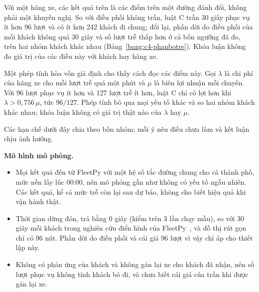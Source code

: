 Với một hãng xe, các kết quả trên là các điểm trên một đường đánh đổi, không phải một khuyến nghị. So với điều phối
không trần, luật C trần 30 giây phục vụ ít hơn 96 lượt và có ít hơn 242 khách đi chung; đổi lại, phần dời do điều phối
của mỗi khách không quá 30 giây và số lượt trễ thấp hơn ở cả bốn ngưỡng đã đo, trên hai nhóm khách khác nhau
(Bảng~\ref{bang:c4-phanbotre}). Khóa luận không đo giá trị của các điều này với khách hay hãng xe.

Một phép tính hòa vốn giả định cho thấy cách đọc các điểm này. Gọi $\lambda$ là chi phí của hãng xe cho mỗi lượt trễ quá
một phút và $\mu$ là biên lợi nhuận mỗi chuyến. Với 96 lượt phục vụ ít hơn và 127 lượt trễ ít hơn, luật C chỉ có lợi hơn
khi $\lambda > 0{,}756\,\mu$, tức $96/127$. Phép tính bỏ qua mọi yếu tố khác và so hai nhóm khách khác nhau; khóa luận
không có giá trị thật nào của $\lambda$ hay $\mu$.

Các hạn chế dưới đây chia theo bốn nhóm; mỗi ý nêu điều chưa làm và kết luận chịu ảnh hưởng.

\textbf{Mô hình mô phỏng.}
\begin{itemize}[leftmargin=1.2cm,itemsep=2pt,topsep=3pt]
\item Mọi kết quả đến từ FleetPy với một hệ số tắc đường chung cho cả thành phố, mức nền lấy lúc 00:00, nên mô phỏng gần
như không có yếu tố ngẫu nhiên. Các kết quả, kể cả mức trễ còn lại sau dự báo, không cho biết hiệu quả khi vận hành thật.
\item Thời gian dừng đón, trả bằng 0 giây (kiểm trên 3 lần chạy mẫu), so với 30 giây mỗi khách trong nghiên cứu điển hình
của FleetPy~\cite{engelhardt2026}, và đồ thị rút gọn chỉ có 96 nút. Phần dời do điều phối và cái giá 96 lượt vì vậy chỉ áp cho
thiết lập này.
\item Không có phản ứng của khách và không gán lại xe cho khách đã nhận, nên số lượt phục vụ không tính khách bỏ đi, và
chưa biết cái giá của trần khi được gán lại xe.
\end{itemize}


